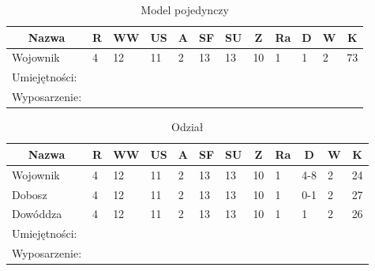 

\begin{table}[h]
\caption{Model pojedynczy}

\begin{tabular}{|l|l|l|l|l|l|l|l|l|l|l|l|}
\hline
\multicolumn{1}{c}{Nazwa} & \multicolumn{1}{c}{R} & \multicolumn{1}{c}{WW} & \multicolumn{1}{c}{US} & \multicolumn{1}{c}{A} & \multicolumn{1}{c}{SF} & \multicolumn{1}{c}{SU} & \multicolumn{1}{c}{Z} & \multicolumn{1}{c}{Ra} & \multicolumn{1}{c}{D} & \multicolumn{1}{c}{W} & \multicolumn{1}{c}{K} \\ \hline
Wojownik & 4 & 12 & 11 & 2 & 13 & 13 & 10 & 1 & 1 & 2 & 73 \\ \hline
Umiejętności: \\ \hline
Wyposarzenie: \\ \hline
\end{tabular}

\end{table}

\begin{table}[h]
\caption{Odział}

\begin{tabular}{|l|l|l|l|l|l|l|l|l|l|l|l|}
\hline
\multicolumn{1}{c}{Nazwa} & \multicolumn{1}{c}{R} & \multicolumn{1}{c}{WW} & \multicolumn{1}{c}{US} & \multicolumn{1}{c}{A} & \multicolumn{1}{c}{SF} & \multicolumn{1}{c}{SU} & \multicolumn{1}{c}{Z} & \multicolumn{1}{c}{Ra} & \multicolumn{1}{c}{D} & \multicolumn{1}{c}{W} & \multicolumn{1}{c}{K} \\ \hline
Wojownik & 4 & 12 & 11 & 2 & 13 & 13 & 10 & 1 & 4-8 & 2 & 24  \\ \hline
Dobosz & 4 & 12 & 11 & 2 & 13 & 13 & 10 & 1 & 0-1 & 2 & 27 \\ \hline
Dowóddza & 4 & 12 & 11 & 2 & 13 & 13 & 10 & 1 & 1 & 2 & 26 \\ \hline
Umiejętności: \\ \hline
Wyposarzenie: \\ \hline
\end{tabular}

\end{table}

